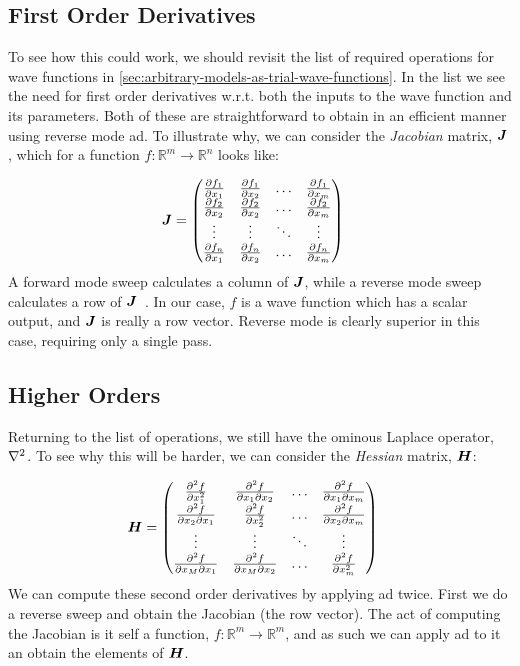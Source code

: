 \documentclass[Thesis.tex]{subfiles}
\begin{document}
\subsection{First Order Derivatives}

To see how this could work, we should revisit the list of required operations
for wave functions in \cref{sec:arbitrary-models-as-trial-wave-functions}. In
the list we see the need for first order derivatives w.r.t. both the inputs to
the wave function and its parameters. Both of these are straightforward to
obtain in an efficient manner using reverse mode \gls{ad}. To illustrate why, we can
consider the \emph{Jacobian} matrix, $\bm{J}$, which for a function
$f:\mathbb{R}^m\to\mathbb{R}^n$ looks like:

\begin{align}
  \bm{J} &=
  \begin{pmatrix}
    \pdv{f_1}{x_1} & \pdv{f_1}{x_2} & \dots & \pdv{f_1}{x_m}\\
    \pdv{f_2}{x_2} & \pdv{f_2}{x_2} & \dots & \pdv{f_2}{x_m}\\
    \vdots & \vdots & \ddots & \vdots\\
    \pdv{f_n}{x_1} & \pdv{f_n}{x_2} & \dots & \pdv{f_n}{x_m}\\
  \end{pmatrix}
\end{align}
A forward mode sweep calculates a column of $\bm{J}$,
while a reverse mode sweep calculates a row of $\bm{J}$~\cite{auto-diff-Berland}. In our case, $f$ is a wave function which has a
scalar output, and $\bm{J}$ is really a row vector. Reverse mode is clearly
superior in this case, requiring only a single pass.\\

\subsection{Higher Orders}

Returning to the list of operations, we still have the ominous Laplace
operator, $\laplacian$. To see why this will be harder, we can consider the
\emph{Hessian} matrix, $\bm{H}$:

\begin{align}
  \bm{H} &=
  \begin{pmatrix}
    \pdv[2]{f}{x_1} & \pdv{f}{x_1}{x_2} & \dots & \pdv{f}{x_1}{x_m}\\
    \pdv{f}{x_2}{x_1} & \pdv[2]{f}{x_2} & \dots & \pdv{f}{x_2}{x_m}\\
    \vdots & \vdots & \ddots & \vdots\\
    \pdv{f}{x_M}{x_1} & \pdv{f}{x_M}{x_2} & \dots & \pdv[2]{f}{x_m}\\
  \end{pmatrix}
\end{align}
We can compute these second order derivatives by applying \gls{ad} twice. First we do
a reverse sweep and obtain the Jacobian (the row vector). The act of computing
the Jacobian is it self a function, $f: \mathbb{R}^m\to\mathbb{R}^m$, and as
such we can apply \gls{ad} to it an obtain the elements of $\bm{H}$.\\
\end{document}
